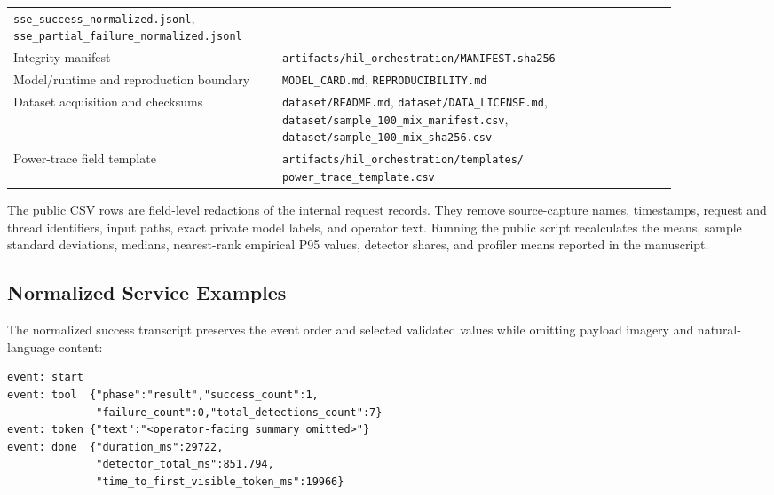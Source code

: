 \begin{table}[H]
\begin{tabular}{p{0.34\linewidth}p{0.53\linewidth}}
\newline\texttt{sse\_success\_normalized.jsonl},
\newline\texttt{sse\_partial\_failure\_normalized.jsonl} \\
\rowcolor{graybg}
Integrity manifest & \texttt{artifacts/hil\_orchestration/MANIFEST.sha256} \\
Model/runtime and reproduction boundary & \texttt{MODEL\_CARD.md}, \texttt{REPRODUCIBILITY.md} \\
\rowcolor{graybg}
Dataset acquisition and checksums & \texttt{dataset/README.md}, \texttt{dataset/DATA\_LICENSE.md},
\newline\texttt{dataset/sample\_100\_mix\_manifest.csv},
\newline\texttt{dataset/sample\_100\_mix\_sha256.csv} \\
Power-trace field template & \texttt{artifacts/hil\_orchestration/templates/}
\newline\texttt{power\_trace\_template.csv} \\
\bottomrule
\end{tabular}
\end{table}

The public CSV rows are field-level redactions of the internal request records. They remove source-capture names, timestamps, request and thread identifiers, input paths, exact private model labels, and operator text. Running the public script recalculates the means, sample standard deviations, medians, nearest-rank empirical P95 values, detector shares, and profiler means reported in the manuscript.

\subsection{Normalized Service Examples}

The normalized success transcript preserves the event order and selected validated values while omitting payload imagery and natural-language content:

\begin{small}
\begin{verbatim}
event: start
event: tool  {"phase":"result","success_count":1,
              "failure_count":0,"total_detections_count":7}
event: token {"text":"<operator-facing summary omitted>"}
event: done  {"duration_ms":29722,
              "detector_total_ms":851.794,
              "time_to_first_visible_token_ms":19966}
\end{verbatim}
\end{small}

